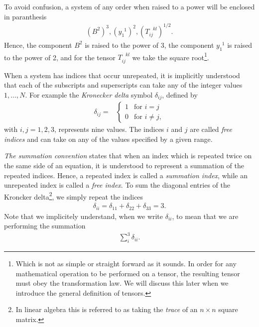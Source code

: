 \documentclass[main.tex]{subfiles}
\begin{document}
To avoid confusion, a system of any order when raised to a power will be enclosed
in paranthesis
\begin{align*}
(B^2)^3, (y_1^{\phantom{1}1})^2, (T_{ij}^{\phantom{ij}kl})^{1/2} .
\end{align*}
Hence, the component $B^2$ is raised to the power of 3, the component 
$y_1^{\phantom{1}1}$ is raised to the power of 2, and for the tensor $T_{ij}^{\phantom{ij}kl}$ 
we take the square root\footnote{Which is not as simple or straight forward as it sounds. 
In order for any mathematical operation to be performed on a tensor, the resulting tensor 
must obey the transformation law. We will discuss this later when we introduce the 
general definition of tensors.}. 

When a system has indices that occur unrepeated, it is implicitly understood that each of
the subscripts and superscripts can take any of the integer values $1,\hdots,N$. For example
the \emph{Kronecker delta} symbol $\delta_{ij}$, defined by
\begin{align} \label{eq:Kroncker_delta}
\delta_{ij} = &
\left\{\begin{matrix}
 1 & \mbox{for } i=j \\
 0 & \mbox{for } i \neq j,
\end{matrix}\right.
\end{align}
with $i,j = 1,2,3$, represents nine values.
The indices $i$ and $j$ are called \emph{free indices} and can take on any of the values specified 
by a given range. 

\emph{The summation convention} states that when an index which is repeated twice on the same 
side of an equation, it is understood to represent a summation of the repeated indices. Hence,
a repeated index is called a \emph{summation index}, while an unrepeated index is called a
\emph{free index}.
To sum the diagonal entries of the Kroncker delta\footnote{In linear algebra this is referred 
to as taking the \emph{trace} of an $n\times n$ square matrix.}, we simply repeat the indices
\begin{align*}
\delta_{ii} = \delta_{11} + \delta_{22} + \delta_{33} = 3.
\end{align*}
Note that we implicitely understand, when we write $\delta_{ii}$, to mean that we are performing
the summation
\begin{align*}
\sum\limits_i^3 \delta_{ii}.
\end{align*}
\end{document}
